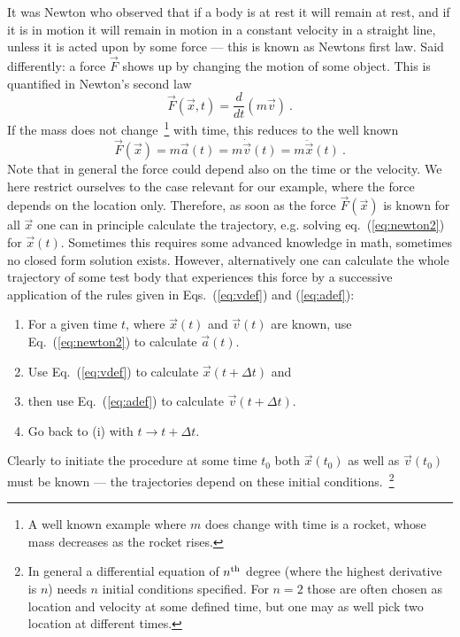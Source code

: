\documentclass[12pt]{iopart}
\begin{document}
It was Newton who observed that if a body is at rest it will remain at rest, and if it is in motion it will remain in motion in a 
constant velocity in a straight line, unless it is acted upon by some force --- this is known as Newtons first law. 
Said differently: a force $\vec F$ shows up by changing the motion of some object. This is quantified in Newton's second law
\begin{equation}
\vec F(\vec x, t) = \frac{d}{dt}(m \vec v) \ .
\end{equation} 
If the mass does not change~\footnote{A well known example where $m$ does change with time is a 
rocket, whose mass decreases as the rocket rises.} with time, this reduces to the well known
\begin{equation}
\vec F(\vec x) = m \vec a(t) = m\dot{\vec v}(t) = m\ddot{\vec{x}}(t) \ . \label{eq:newton2}
\end{equation} 
Note that in general the force could depend also on the time or the velocity. We here restrict ourselves to the
case relevant for our example, where the force depends on the location only. 
Therefore, 
as soon as the force $\vec F(\vec x)$ is known for all $\vec x$ one can in principle calculate the trajectory, e.g. solving eq.~(\ref{eq:newton2})
for $\vec x(t)$.
Sometimes this requires some advanced knowledge in math, sometimes no closed form solution exists. However, alternatively 
one can calculate the whole trajectory
of some test body that experiences this force by a successive application of the rules 
given in Eqs.~(\ref{eq:vdef}) and (\ref{eq:adef}):
%
%
\begin{enumerate}
\item For a given time $t$, where $\vec x(t)$ and $\vec v(t)$ are known, use Eq.~(\ref{eq:newton2}) to calculate $\vec a(t)$.
\item Use Eq.~(\ref{eq:vdef}) to calculate $\vec x(t+\Delta t)$ and
\item then use Eq.~(\ref{eq:adef}) to calculate $\vec v(t+\Delta t)$.
\item Go back to (i) with $t\to t+\Delta t$.
\end{enumerate}
Clearly to initiate the procedure at some time $t_0$ both $\vec x(t_0)$ as well as $\vec v(t_0)$ must be known --- the 
trajectories depend on these initial conditions.~\footnote{In general a differential equation of $n^{\rm th}$ degree (where
the highest derivative is $n$) needs $n$ initial conditions specified. For $n=2$ those are often chosen as location and velocity
at some defined time, but one may as well pick two location at different times. }
\end{document}
